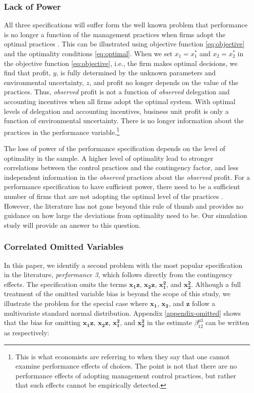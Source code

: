 \documentclass[12pt]{article}
\begin{document}
\subsubsection{Lack of Power}

All three specifications will suffer form the well known problem that performance is no longer a function of the management practices when firms adopt the optimal practices \citep{grabner_management_2013}. This can be illustrated using objective function \eqref{eq:objective} and the optimality conditions \eqref{eq:optimal}. When we set $x_1 = x_1^*$ and $x_2 = x_2^*$ in the objective function  \eqref{eq:objective}, i.e., the firm makes optimal decisions, we find that profit, $y$, is fully determined by the unknown parameters and environmental uncertainty, $z$, and profit no longer depends on the value of the practices. Thus, \textit{observed} profit is not a function of \textit{observed} delegation and accounting incentives when all firms adopt the optimal system. With optimal levels of delegation and accounting incentives, business unit profit is only a function of environmental uncertainty. There is no longer information about the practices in the performance variable.\footnote{This is what economists are referring to when they say that one cannot examine performance effects of choices. The point is not that there are no performance effects of adopting management control practices, but rather that such effects cannot be empirically detected.} 

The loss of power of the performance specification depends on the level of optimality in the sample. A higher level of optimality lead to stronger  correlations between the control practices and the contingency factor, and less independent information in the \textit{observed} practices about the \textit{observed} profit. For a performance specification to have sufficient power, there need to be a sufficient number of firms that are not adopting the optimal level of the practices \citep{bedford_management_2016, carree_note_2011, hofmann_organizational_2017}. However, the literature has not gone beyond this rule of thumb and provides no guidance on how large the deviations from optimality need to be. Our simulation study will provide an answer to this question.

\subsubsection{Correlated Omitted Variables}

In this paper, we identify a second problem with the most popular specification in the literature, \emph{performance 3}, which follows directly from the contingency effects. The specification omits the terms $\mathbf{x_1 z}$, $\mathbf{x_2 z}$, $\mathbf{x_1^2}$, and $\mathbf{x_2^2}$. Although a full treatment of the omitted variable bias is beyond the scope of this study, we illustrate the problem for the special case where $\mathbf{x_1}$, $\mathbf{x_2}$, and $\mathbf{z}$ follow a multivariate standard normal distribution. Appendix \ref{appendix-omitted} shows that the bias for omitting $\mathbf{x_1 z}$, $\mathbf{x_2 z}$, $\mathbf{x_1^2}$, and $\mathbf{x_2^2}$ in the estimate $\beta^{p3}_{12}$ can be written as respectively:
\end{document}
